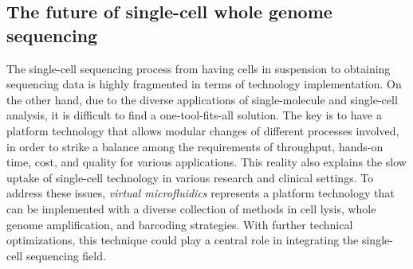 \subsection{The future of single-cell whole genome sequencing}
The single-cell sequencing process from having cells in suspension to obtaining sequencing data is highly fragmented in terms of technology implementation. On the other hand, due to the diverse applications of single-molecule and single-cell analysis, it is difficult to find a one-tool-fits-all solution. The key is to have a platform technology that allows modular changes of different processes involved, in order to strike a balance among the requirements of throughput, hands-on time, cost, and quality for various applications. This reality also explains the slow uptake of single-cell technology in various research and clinical settings. To address these issues, \textit{virtual microfluidics} represents a platform technology that can be implemented with a diverse collection of methods in cell lysis, whole genome amplification, and barcoding strategies. With further technical optimizations, this technique could play a central role in integrating the single-cell sequencing field.


